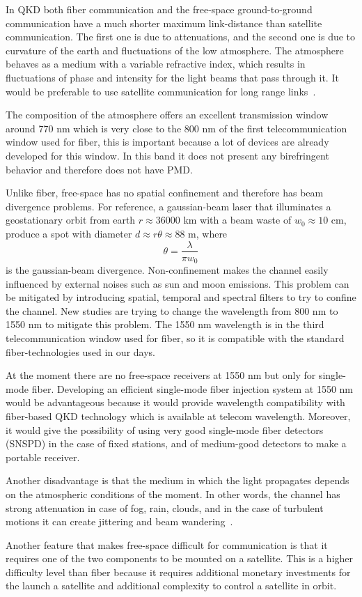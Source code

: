 
In QKD both fiber communication and the free-space ground-to-ground communication have a much shorter maximum link-distance than satellite communication. The first one is due to attenuations, and the second one is due to curvature of the earth and fluctuations of the low atmosphere. The atmosphere behaves as a medium with a variable refractive index, which results in fluctuations of phase and intensity for the light beams that pass through it. It would be preferable to use satellite communication for long range links~\cite{a14}.

The composition of the atmosphere offers an excellent transmission window around 770 nm which is very close to the 800 nm of the first telecommunication window used for fiber, this is important because a lot of devices are already developed for this window. In this band it does not present any birefringent behavior and therefore does not have PMD.

Unlike fiber, free-space has no spatial confinement and therefore has beam divergence problems. For reference, a gaussian-beam laser that illuminates a geostationary orbit from earth $r \approx 36000$ km with a beam waste of $w_0 \approx 10$ cm, produce a spot with diameter $d \approx r \theta \approx 88$ m, where
\begin{equation}
  \theta = \frac{\lambda}{\pi w_0}
\end{equation}
is the gaussian-beam divergence. Non-confinement makes the channel easily influenced by external noises such as sun and moon emissions. This problem can be mitigated by introducing spatial, temporal and spectral filters to try to confine the channel. New studies are trying to change the wavelength from 800 nm to 1550 nm to mitigate this problem. The 1550 nm wavelength is in the third telecommunication window used for fiber, so it is compatible with the standard fiber-technologies used in our days.

At the moment there are no free-space receivers at 1550 nm but only for single-mode fiber. Developing an efficient single-mode fiber injection system at 1550 nm would be advantageous because it would provide wavelength compatibility with fiber-based QKD technology which is available at telecom wavelength. Moreover, it would give the possibility of using very good single-mode fiber detectors (SNSPD) in the case of fixed stations, and of medium-good detectors to make a portable receiver.

Another disadvantage is that the medium in which the light propagates depends on the atmospheric conditions of the moment. In other words, the channel has strong attenuation in case of fog, rain, clouds, and in the case of turbulent motions it can create jittering and beam wandering~\cite{a25}.

Another feature that makes free-space difficult for communication is that it requires one of the two components to be mounted on a satellite. This is a higher difficulty level than fiber because it requires additional monetary investments for the launch a satellite and additional complexity to control a satellite in orbit.